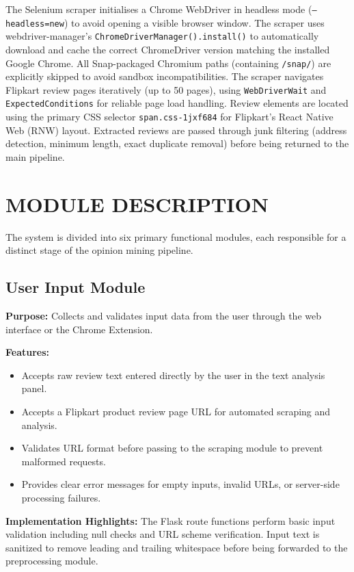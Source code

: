 \documentclass[12pt,a4paper]{report}
\begin{document}
The Selenium scraper initialises a Chrome WebDriver in headless mode (\texttt{--headless=new}) to avoid opening a visible browser window. The scraper uses webdriver-manager's \texttt{ChromeDriverManager().install()} to automatically download and cache the correct ChromeDriver version matching the installed Google Chrome. All Snap-packaged Chromium paths (containing \texttt{/snap/}) are explicitly skipped to avoid sandbox incompatibilities. The scraper navigates Flipkart review pages iteratively (up to 50 pages), using \texttt{WebDriverWait} and \texttt{ExpectedConditions} for reliable page load handling. Review elements are located using the primary CSS selector \texttt{span.css-1jxf684} for Flipkart's React Native Web (RNW) layout. Extracted reviews are passed through junk filtering (address detection, minimum length, exact duplicate removal) before being returned to the main pipeline.

\section{MODULE DESCRIPTION}

The system is divided into six primary functional modules, each responsible for a distinct stage of the opinion mining pipeline.

\subsection{User Input Module}

\textbf{Purpose:} Collects and validates input data from the user through the web interface or the Chrome Extension.

\textbf{Features:}
\begin{itemize}
  \item Accepts raw review text entered directly by the user in the text analysis panel.
  \item Accepts a Flipkart product review page URL for automated scraping and analysis.
  \item Validates URL format before passing to the scraping module to prevent malformed requests.
  \item Provides clear error messages for empty inputs, invalid URLs, or server-side processing failures.
\end{itemize}

\textbf{Implementation Highlights:} The Flask route functions perform basic input validation including null checks and URL scheme verification. Input text is sanitized to remove leading and trailing whitespace before being forwarded to the preprocessing module.
\end{document}
